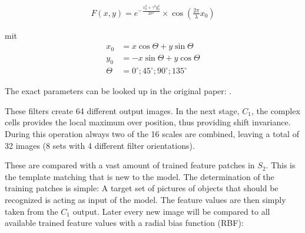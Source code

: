 			\begin{align*}
				F\left(x,y\right) = e^{-\frac{x_0^2+\gamma^2 y_0^2}{2 \sigma^2}} \times \cos\left(\frac{2\pi}{\lambda}x_0\right)
			\end{align*}
			
			mit \vspace*{-0.8cm}
			\begin{align*}
			 x_0 &= x \cos\Theta + y \sin\Theta \\
				y_0 &= -x \sin\Theta + y \cos\Theta \\
				\Theta &= 0^\circ; 45^\circ; 90^\circ; 135^\circ
			\end{align*}
			
			\vspace*{0.2cm}
			
			The exact parameters can be looked up in the original paper:  \citep{serre2007robust}.
%			
%
%			

			\vspace*{0.3cm}

			These filters create 64 different output images. In the next stage, $ C_1 $, the complex cells provides the local maximum over position, thus providing shift invariance. During this operation always two of the 16 scales are combined, leaving a total of 32 images (8 sets with 4 different filter orientations).
			
			These are compared with a vast amount of trained feature patches in $S_2$. This is the template matching that is new to the model. The determination of the training patches is simple: A target set of pictures of objects that should be recognized is acting as input of the model. The feature values are then simply taken from the $C_1$ output. Later every new image will be compared to all available trained feature values with a radial bias function (RBF):
			
